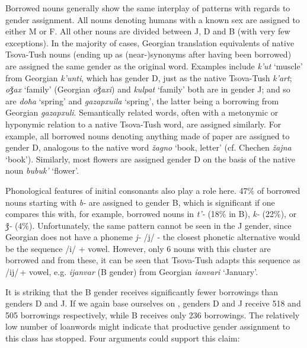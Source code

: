 Borrowed nouns generally show the same interplay of patterns with regards to gender assignment. All nouns denoting humans with a known sex are assigned to either M or F. All other nouns are divided between J, D and B (with very few exceptions). In the majority of cases, Georgian translation equivalents of native Tsova-Tush nouns (ending up as (near-)synonyms after having been borrowed) are assigned the same gender as the original word. Examples include \textit{k'ut} `muscle’ from Georgian \textit{k'unti}, which has gender D, just as the native Tsova-Tush \textit{k'art}; \textit{oǯax} `family’ (Georgian \textit{oǯaxi}) and \textit{kulpat} `family’ both are in gender J; and so are \textit{doħa} `spring’ and \textit{gazapxuila} `spring’, the latter being a borrowing from Georgian \textit{gazapxuli}. Semantically related words, often with a metonymic or hyponymic relation to a native Tsova-Tush word, are assigned similarly. For example, all borrowed nouns denoting anything made of paper are assigned to gender D, analogous to the native word \textit{žagno} ‘book, letter’ (cf. Chechen \textit{žajna} ‘book’). Similarly, most flowers are assigned gender D on the basis of the native noun \textit{bubuk'} `flower’. 

Phonological features of initial consonants also play a role here. 47\% of borrowed nouns starting with \textit{b-} are assigned to gender B, which is significant if one compares this with, for example, borrowed nouns in \textit{t'-} (18\% in B), \textit{k-} (22\%), or \textit{ǯ-} (4\%). Unfortunately, the same pattern cannot be seen in the J gender, since Georgian does not have a phoneme \textit{j-} /j/ - the closest phonetic alternative would be the sequence /i/ + vowel. However, only 6 nouns with this cluster are borrowed and from these, it can be seen that Tsova-Tush adapts this sequence as /ij/\,+ vowel, e.g. \textit{ijanvar} (B gender) from Georgian \textit{ianvari} `January’.

It is striking that the B gender receives significantly fewer borrowings than genders D and J. If we again base ourselves on \textcite{kadkad84}, genders D and J receive 518 and 505 borrowings respectively, while B receives only 236 borrowings. The relatively low number of loanwords might indicate that productive gender assignment to this class has stopped. Four arguments could support this claim: 

